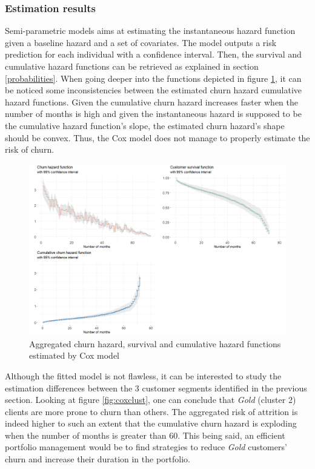 \documentclass[
]{book}
\begin{document}
\hypertarget{estimation-results}{%
\subsubsection*{Estimation results}\label{estimation-results}}

Semi-parametric models aims at estimating the instantaneous hazard function given a baseline hazard and a set of covariates. The model outputs a risk prediction for each individual with a confidence interval. Then, the survival and cumulative hazard functions can be retrieved as explained in section \ref{probabilities}. When going deeper into the functions depicted in figure \ref{fig:coxdataviz}, it can be noticed some inconsistencies between the estimated churn hazard cumulative hazard functions. Given the cumulative churn hazard increases faster when the number of months is high and given the instantaneous hazard is supposed to be the cumulative hazard function's slope, the estimated churn hazard's shape should be convex. Thus, the Cox model does not manage to properly estimate the risk of churn.

\begin{figure}

{\centering \includegraphics[width=20.83in]{./imgs/cox_data_viz} 

}

\caption{Aggregated churn hazard, survival and cumulative hazard functions estimated by Cox model}\label{fig:coxdataviz}
\end{figure}

Although the fitted model is not flawless, it can be interested to study the estimation differences between the 3 customer segments identified in the previous section. Looking at figure \ref{fig:coxclust}, one can conclude that \emph{Gold} (cluster 2) clients are more prone to churn than others. The aggregated risk of attrition is indeed higher to such an extent that the cumulative churn hazard is exploding when the number of months is greater than 60. This being said, an efficient portfolio management would be to find strategies to reduce \emph{Gold} customers' churn and increase their duration in the portfolio.
\end{document}
